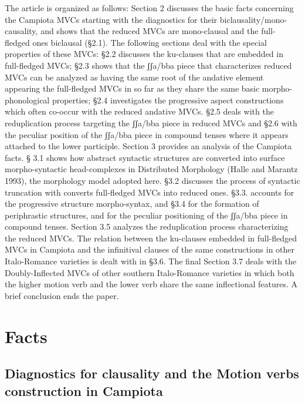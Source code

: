 \documentclass[output=paper,colorlinks,citecolor=brown,
]{langscibook}
\begin{document}
The article is organized as follows:  Section 2 discusses the basic facts concerning the Campiota MVCs starting with the diagnostics for their biclausality/mono-causality, and shows that the reduced MVCs are mono-clausal and the full-fledged ones biclausal (§2.1).  The following sections deal with the special properties of these MVCs:  §2.2 discusses the ku-clauses that are embedded in full-fledged MVCs; §2.3 shows that the ʃʃa/bba piece that characterizes reduced MVCs can be analyzed as having the same root of the andative element appearing  the full-fledged MVCs in so far as they share the same basic morpho-phonological properties; §2.4 investigates the progressive aspect constructions which often co-occur with the reduced andative MVCs. §2.5 deals with the reduplication process targeting the ʃʃa/bba piece in reduced MVCs and §2.6 with the peculiar position of the ʃʃa/bba piece in compound tenses where it appears attached to the lower participle.  Section 3 provides an analysis of the Campiota facts.  § 3.1 shows how abstract syntactic structures are converted into surface morpho-syntactic head-complexes in Distributed Morphology (Halle and Marantz 1993), the morphology model adopted here. §3.2 discusses the process of syntactic truncation with converts full-fledged MVCs into reduced ones.  §3.3. accounts for the progressive structure morpho-syntax, and §3.4 for the formation of periphrastic structures, and for the peculiar positioning of the ʃʃa/bba piece in compound tenses.  Section 3.5 analyzes the reduplication process characterizing the reduced MVCs.  The relation between the ku-clauses embedded in full-fledged MVCs in Campiota and the infinitival clauses of the same constructions in other Italo-Romance varieties is dealt with in §3.6.  The final Section 3.7 deals with the Doubly-Inflected MVCs of other southern Italo-Romance varieties in which both the higher motion verb and the lower verb share the same inflectional features.  A brief conclusion ends the paper.  

\section{Facts}
\subsection{Diagnostics for clausality and the Motion verbs construction in Campiota}
\end{document}
